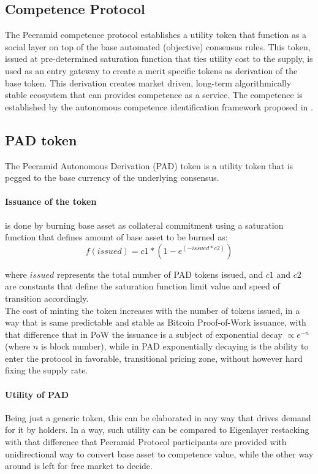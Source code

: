 \documentclass{article}
\begin{document}
\begin{CJK}{UTF8}{gbsn}
\begin{multicols}{2}
        \section{Competence Protocol}

        The Peeramid competence protocol establishes a utility token that function as a social layer on top of the base automated (objective) consensus rules. This token, issued at pre-determined saturation function that ties utility cost to the supply, is used as an entry gateway to create a merit specific tokens as derivation of the base token. This derivation creates market driven, long-term algorithmically stable ecosystem that can provides competence as a service. The competence is established by the autonomous competence identification framework proposed in \cite{PeerskyACID2024}.

        \subsection*{PAD token}

        The Peeramid Autonomous Derivation (PAD) token is a utility token that is pegged to the base currency of the underlying consensus.

        \paragraph*{Issuance of the token} is done by burning base asset as collateral commitment using a saturation function that defines amount of base asset to be burned as:
        \begin{equation}
            \label{eq:cost}
            f(issued)=c1*(1-e^{(-issued*c2)})
        \end{equation}

        where $issued$ represents the total number of PAD tokens issued, and $c1$ and $c2$ are constants that define the saturation function limit value and speed of transition accordingly. \\The cost of minting the token increases with the number of tokens issued, in a way that is same predictable and stable as Bitcoin Proof-of-Work issuance, with that difference that in PoW the issuance is a subject of exponential decay $\propto e^{-n}$ (where $n$ is block number), while in PAD exponentially decaying is the ability to enter the protocol in favorable, transitional pricing zone, without however hard fixing the supply rate.

        \paragraph{Utility of PAD} Being just a generic token, this can be elaborated in any way that drives demand for it by holders.
        In a way, such utility can be compared to Eigenlayer restacking with that difference that Peeramid Protocol participants are provided with unidirectional way to convert base asset to competence value, while the other way around is left for free market to decide.


\end{multicols}
\end{CJK}
\end{document}
